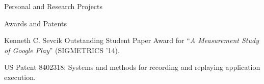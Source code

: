\documentclass{resume} %
\begin{document}
\begin{rSection}{Personal and Research Projects}

\end{rSection}


\begin{rSection}{Awards and Patents}
\begin{rList}
\item Kenneth C. Sevcik Outstanding Student Paper Award for ``{\em A Measurement Study of Google Play}'' (SIGMETRICS '14).
\item US Patent 8402318: Systems and methods for recording and replaying application execution.
\end{rList}
\end{rSection}

\end{document}
